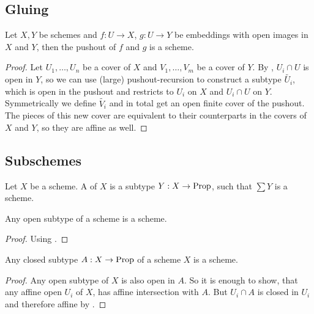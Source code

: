 \subsection{Gluing}

\begin{proposition}%
  Let $X,Y$ be schemes and $f:U\to X$, $g:U\to Y$ be embeddings with open images in $X$ and $Y$,
  then the pushout of $f$ and $g$ is a scheme.
\end{proposition}

\begin{proof}
  Let $U_1,\dots,U_n$ be a cover of $X$ and $V_1,\dots,V_m$ be a cover of $Y$.
  By , $U_i\cap U$ is open in $Y$,
  so we can use (large) pushout-recursion to construct a subtype $\tilde{U_i}$,
  which is open in the pushout and restricts to $U_i$ on $X$ and $U_i\cap U$ on $Y$.
  Symmetrically we define $\tilde{V_i}$ and in total get an open finite cover of the pushout.
  The pieces of this new cover are equivalent to their counterparts in the covers of $X$ and $Y$,
  so they are affine as well.
\end{proof}

\subsection{Subschemes}

\begin{definition}
  Let $X$ be a scheme.
  A  of $X$ is a subtype $Y:X\to\mathrm{Prop}$,
  such that $\sum Y$ is a scheme.
\end{definition}

\begin{proposition}%
  \label{open-subscheme}
  Any open subtype of a scheme is a scheme.
\end{proposition}

\begin{proof}
  Using .
\end{proof}

\begin{proposition}%
  \label{closed-subscheme}
  Any closed subtype $A:X\to \mathrm{Prop}$ of a scheme $X$ is a scheme.
\end{proposition}

\begin{proof}
  Any open subtype of $X$ is also open in $A$.
  So it is enough to show,
  that any affine open $U_i$ of $X$,
  has affine intersection with $A$.
  But $U_i\cap A$ is closed in $U_i$ and therefore affine by .
\end{proof}

